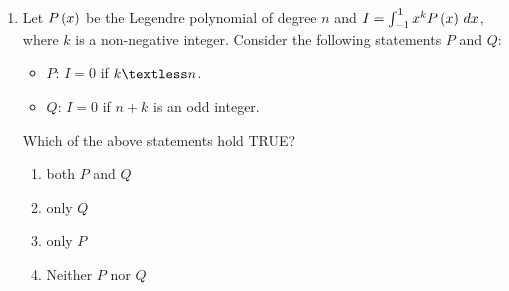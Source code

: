 \documentclass[journal,12pt,twocolumn]{IEEEtran}
\theoremstyle{remark}
\begin{document}
\begin{enumerate}[start=1]
    \item Let $P\left(x\right)$ be the Legendre polynomial of degree $n$ and $I = \int_{-1}^{1} x^k P\left(x\right) \, dx$, where $k$ is a non-negative integer. Consider the following statements $P$ and $Q$:
    \begin{itemize}
        \item $P$: $I = 0$ if $k \textless n$.
        \item $Q$: $I = 0$ if $n + k$ is an odd integer.
    \end{itemize}
    Which of the above statements hold TRUE?
    \begin{enumerate}
       
        \item both $P$ and $Q$
        \item only $Q$
        \item only $P$
        \item Neither $P$ nor $Q$
    \end{enumerate}

 
 
\end{enumerate}
\end{document}
